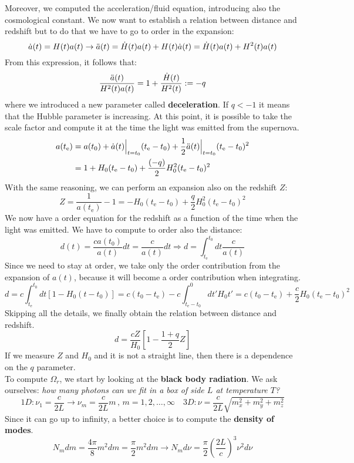 \documentclass[10.75pt,a4paper,openright,bottom=2cm]{article}
\begin{document}
Moreover, we computed the acceleration/fluid equation, introducing also the cosmological constant. We now want to establish a relation between distance and redshift but to do that we have to go to  order in the expansion:
\[
\Dot{a}(t)=H(t)a(t)\to\Ddot{a}(t)=\Dot{H}(t)a(t)+H(t)\Dot{a}(t)=\Dot{H}(t)a(t)+H^2(t)a(t)
\]
From this expression, it follows that:
\[
\frac{\Ddot{a}(t)}{H^2(t)a(t)}=1+\frac{\Dot{H}(t)}{H^2(t)}:=-q
\]
where we introduced a new parameter called \textbf{deceleration}. If $q<-1$ it means that the Hubble parameter is increasing. At this point, it is possible to take the scale factor and compute it at the time the light was emitted from the supernova.
\[
\begin{aligned}
a(t_{\text{e}})&=a(t_0)+\Dot{a}(t)\Bigr|_{\substack{t=t_0}}(t_{\text{e}}-t_0)+\frac{1}{2}\Ddot{a}(t)\Bigr|_{\substack{t=t_0}}(t_{\text{e}}-t_0)^2\\
&=1+H_0(t_{\text{e}}-t_0)+\frac{(-q)}{2}H_0^2(t_{\text{e}}-t_0)^2
\end{aligned}
\]
With the same reasoning, we can perform an expansion also on the redshift $Z$:
\[
Z=\frac{1}{a(t_{\text{e}})}-1=-H_0(t_{\text{e}}-t_0)+\frac{q}{2}H_0^2(t_{\text{e}}-t_0)^2
\]
We now have a  order equation for the redshift as a function of the time when the light was emitted. We have to compute to  order also the distance:
\[
d(t)=\frac{ca(t_0)}{a(t)}dt=\frac{c}{a(t)}dt\Rightarrow d=\int_{t_{\text{e}}}^{t_0}dt\frac{c}{a(t)}
\]
Since we need to stay at  order, we take only the  order contribution from the expansion of $a(t)$, because it will become a  order contribution when integrating.
\[
d=c\int_{t_{\text{e}}}^{t_0}dt[1-H_0(t-t_0)]=c(t_0-t_{\text{e}})-c\int_{t_{\text{e}}-t_0}^{0}dt'H_0t'=c(t_0-t_{\text{e}})+\frac{c}{2}H_0(t_{\text{e}}-t_0)^2
\]
Skipping all the details, we finally obtain the relation between distance and redshift.
\[
d=\frac{cZ}{H_0}\left[1-\frac{1+q}{2}Z\right]
\]
If we measure $Z$ and $H_0$ and it is not a straight line, then there is a dependence on the $q$ parameter.\\
To compute $\Omega_r$, we start by looking at the \textbf{black body radiation}. We ask ourselves: \textit{how many photons can we fit in a box of side $L$ at temperature $T$?}
\[
1D: \nu_1=\frac{c}{2L}\to\nu_m=\frac{c}{2L}m\,,\,m=1,2,\dots,\infty \quad 3D: \nu=\frac{c}{2L}\sqrt{m_x^2+m_y^2+m_z^2}
\]
Since it can go up to infinity, a better choice is to compute the \textbf{density of modes}.
\[
N_mdm=\frac{4\pi}{8}m^2dm=\frac{\pi}{2}m^2dm\to N_md\nu=\frac{\pi}{2}\left(\frac{2L}{c}\right)^3\nu^2d\nu
\]
\end{document}

